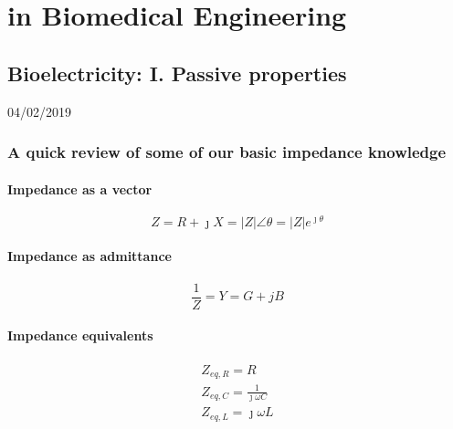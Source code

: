 \documentclass[11pt]{book}
\begin{document}



\part{in Biomedical Engineering}

\chapter{Bioelectricity: I. Passive properties}
04/02/2019 
\minitoc
\newpage
\section{A quick review of some of our basic impedance knowledge}
\subsection{Impedance as a vector}
\begin{equation}
	Z = R + \jmath X = |Z|\angle \theta = |Z|e^{\jmath\theta}  
\end{equation}
\subsection{Impedance as admittance}
\begin{equation}
	\frac{1}{Z} = Y = G + jB
\end{equation}
\subsection{Impedance equivalents}
\begin{eqnarray}
	Z_{eq,R}= R \\
	Z_{eq,C} = \frac{1}{\jmath \omega C} \\
	Z_{eq,L} = \jmath \omega L
\end{eqnarray}
\end{document}
